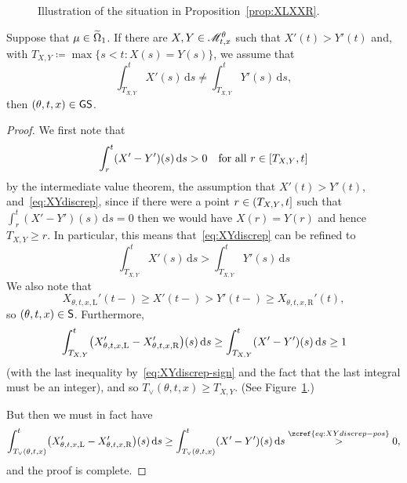 \documentclass[AHL,Unicode,longabstracts]{cedram}
\newcommand*\ssS{\mathsf{S}}
\newcommand*\GS{\mathsf{GS}}
\newcommand*\scM{\mathscr{M}}
\newcommand*\st{\mathrel{:}}
\newcommand*\dif{\mathrm{d}}
\newcommand*\Left{\mathrm{L}}
\newcommand*\Right{\mathrm{R}}
\let\oldin\in
\renewcommand{\in}{\mathchoice{\oldin}{\oldin}{\,\oldin\,}{\,\oldin\,}}
\let\originalleft\left
\let\originalright\right
\renewcommand{\left}{\mathopen{}\mathclose\bgroup\originalleft}
\renewcommand{\right}{\aftergroup\egroup\originalright}
\begin{document}
\begin{figure}[!htbp]
\begin{centering}
\scalebox{0.9}{}
\end{centering}
\caption[Illustration of the situation in Proposition~\ref{prop:XLXXR}]{Illustration of the situation in Proposition~\ref{prop:XLXXR}.}
\label{fig:XLXXR_picture}
\end{figure}

\begin{prop}\label{prop:XLXXR}
Suppose that $\mu\in\widetilde{\Omega}_{1}$. If there are $X,Y\in\scM_{t,x}^{\theta}$ such that $X'(t)>Y'(t)$ and, with $T_{X,Y}\coloneqq\max\{s<t\st X(s)=Y(s)\}$, we assume that
\begin{equation}\label{eq:XYdiscrep}
\int_{T_{X,Y}}^{t}X'(s)\,\dif s\ne\int_{T_{X,Y}}^{t}Y'(s)\,\dif s,
\end{equation}
then $(\theta,t,x)\in\GS$.
\end{prop}

\begin{proof}
We first note that
\begin{equation}\label{eq:XYdiscrep-pos}
\int_{r}^{t}(X'-Y')(s)\,\dif s>0\quad\text{for all }r\in[T_{X,Y},t]
\end{equation}
by the intermediate value theorem, the assumption that $X'(t)>Y'(t)$, and~\eqref{eq:XYdiscrep}, since if there were a point $r\in(T_{X,Y},t]$ such that $\int_{r}^{t}(X'-Y')(s)\,\dif s=0$ then we would have $X(r)=Y(r)$ and hence $T_{X,Y}\ge r$. In particular, this means that~\eqref{eq:XYdiscrep} can be refined to
\begin{equation}\label{eq:XYdiscrep-sign}
\int_{T_{X,Y}}^{t}X'(s)\,\dif s>\int_{T_{X,Y}}^{t}Y'(s)\,\dif s
\end{equation}
We also note that
\[
X_{\theta,t,x,\Left}'(t-)\ge X'(t-)>Y'(t-)\ge X_{\theta,t,x,\Right}'(t),
\]
so $(\theta,t,x)\in\ssS$. Furthermore,
\[
\int_{T_{X,Y}}^{t}\left(X_{\theta,t,x,\Left}'-X_{\theta,t,x,\Right}'\right)(s)\,\dif s\ge\int_{T_{X,Y}}^{t}(X'-Y')(s)\,\dif s\ge1
\]
(with the last inequality by~\eqref{eq:XYdiscrep-sign} and the fact that the last integral must be an integer), and so $T_{\vee}(\theta,t,x)\ge T_{X,Y}$. (See Figure~\ref{fig:XLXXR_picture}.)


But then we must in fact have
\[
\int_{T_{\vee}(\theta,t,x)}^{t}\left(X_{\theta,t,x,\Left}'-X_{\theta,t,x,\Right}' \right)(s)\,\dif s\ge\int_{T_{\vee}(\theta,t,x)}^{t}(X'-Y')(s)\,\dif s\overset{\zcref{eq:XYdiscrep-pos}}{>}0,
\]
and the proof is complete.
\end{proof}
\end{document}
